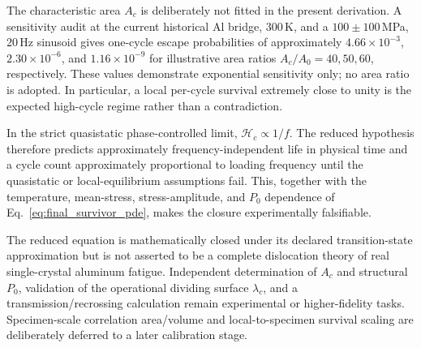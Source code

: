 The characteristic area $A_c$ is deliberately not fitted in the present derivation. A sensitivity audit at the current historical Al bridge, $300\,$K, and a $100\pm100\,$MPa, $20\,$Hz sinusoid gives one-cycle escape probabilities of approximately $4.66\times10^{-3}$, $2.30\times10^{-6}$, and $1.16\times10^{-9}$ for illustrative area ratios $A_c/A_0=40,50,60$, respectively. These values demonstrate exponential sensitivity only; no area ratio is adopted. In particular, a local per-cycle survival extremely close to unity is the expected high-cycle regime rather than a contradiction.

In the strict quasistatic phase-controlled limit, $\mathcal H_c\propto1/f$. The reduced hypothesis therefore predicts approximately frequency-independent life in physical time and a cycle count approximately proportional to loading frequency until the quasistatic or local-equilibrium assumptions fail. This, together with the temperature, mean-stress, stress-amplitude, and $P_0$ dependence of Eq.~\eqref{eq:final_survivor_pde}, makes the closure experimentally falsifiable.

The reduced equation is mathematically closed under its declared transition-state approximation but is not asserted to be a complete dislocation theory of real single-crystal aluminum fatigue. Independent determination of $A_c$ and structural $P_0$, validation of the operational dividing surface $\lambda_c$, and a transmission/recrossing calculation remain experimental or higher-fidelity tasks. Specimen-scale correlation area/volume and local-to-specimen survival scaling are deliberately deferred to a later calibration stage.
